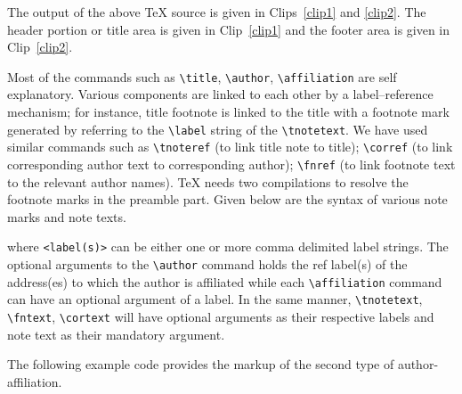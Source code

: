 \documentclass[a4paper,12pt]{article}
\begin{document}
The output of the above \TeX{} source is given in Clips~\ref{clip1} and
\ref{clip2}. The header portion or title area is given in
Clip~\ref{clip1} and the footer area is given in Clip~\ref{clip2}.

\vspace*{1pc}

\def\rulecolor{blue!70}
\def\rulecolor{orange}

\pagebreak

\def\rulecolor{blue!70}
\def\rulecolor{orange}

Most of the commands such as \verb+\title+, \verb+\author+,
\verb+\affiliation+ are self explanatory.  Various components are
linked to each other by a label--reference mechanism; for
instance, title footnote is linked to the title with a footnote
mark generated by referring to the \verb+\label+ string of
the \verb=\tnotetext=.  We have used similar commands
such as \verb=\tnoteref= (to link title note to title);
\verb=\corref= (to link corresponding author text to
corresponding author); \verb=\fnref= (to link footnote text to
the relevant author names).  \TeX{} needs two compilations to
resolve the footnote marks in the preamble part.  
Given below are the syntax of various note marks and note texts.


\begin{vquote}
\end{vquote}

\noindent where \verb=<label(s)>= can be either one or more comma
delimited label strings. The optional arguments to the
\verb=\author= command holds the ref label(s) of the address(es)
to which the author is affiliated while each \verb=\affiliation=
command can have an optional argument of a label. In the same
manner, \verb=\tnotetext=, \verb=\fntext=, \verb=\cortext= will
have optional arguments as their respective labels and note text
as their mandatory argument.

The following example code provides the markup of the second type
of author-affiliation.
\end{document}
